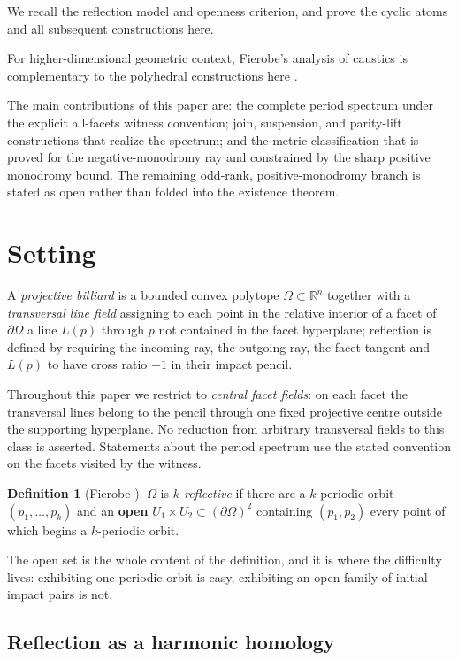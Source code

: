 \documentclass[11pt,a4paper]{article}
\theoremstyle{plain}
\theoremstyle{definition}
\newtheorem{definition}[theorem]{Definition}
\theoremstyle{remark}
\begin{document}
We recall the reflection model and openness criterion, and prove the cyclic atoms and all subsequent constructions here.

For higher-dimensional geometric context, Fierobe's analysis of caustics is
complementary to the polyhedral constructions here \cite{fie-caustics}.

The main contributions of this paper are: the complete period spectrum under
the explicit all-facets witness convention; join, suspension, and parity-lift
constructions that realize the spectrum; and the metric classification that is
proved for the negative-monodromy ray and constrained by the sharp positive
monodromy bound.  The remaining odd-rank, positive-monodromy branch is stated
as open rather than folded into the existence theorem.
\section{Setting}\label{sec:setting}

A \emph{projective billiard} \cite{tab} is a bounded convex polytope
$\Omega\subset\mathbb{R}^n$ together with a \emph{transversal line field}
assigning to each point in the relative interior of a facet of $\partial\Omega$
a line $L(p)$ through $p$ not contained in the facet hyperplane; reflection is
defined by requiring the incoming ray, the outgoing ray, the facet tangent and
$L(p)$ to have cross ratio $-1$ in their impact pencil.

Throughout this paper we restrict to \emph{central facet fields}: on each
facet the transversal lines belong to the pencil through one fixed projective
centre outside the supporting hyperplane. No reduction from arbitrary
transversal fields to this class is asserted. Statements about the period
spectrum use the stated convention on the facets visited by the witness.

\begin{definition}[Fierobe \cite{fie-ex}]\label{def:krefl}
$\Omega$ is \emph{$k$-reflective} if there are a $k$-periodic orbit
$(p_1,\dots,p_k)$ and an \textbf{open} $U_1\times U_2\subset(\partial\Omega)^2$
containing $(p_1,p_2)$ every point of which begins a $k$-periodic orbit.
\end{definition}

The open set is the whole content of the definition, and it is where the difficulty
lives: exhibiting one periodic orbit is easy, exhibiting an open family of initial
impact pairs is not.

\subsection{Reflection as a harmonic homology}
\end{document}
